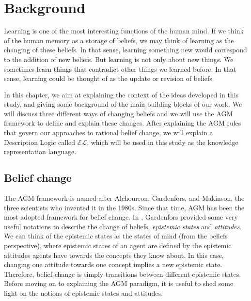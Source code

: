 \chapter{Background}
\label{background}
Learning is one of the most interesting functions of the human mind. If we think of the human memory as a storage of beliefs, we may think of learning as the changing of these beliefs. In that sense, learning something new would correspond to the addition of new beliefs. But learning is not only about new things. We sometimes learn things that contradict other things we learned before. In that sense, learning could be thought of as the update or revision of beliefs. 

In this chapter, we aim at explaining the context of the ideas developed in this study, and giving some background of the main building blocks of our work. We will discuss three different ways of changing beliefs and we will use the AGM framework\cite{kr} to define and explain these changes. After explaining the AGM rules that govern our approaches to rational belief change, we will explain a Description Logic called $\mathcal{EL}$, which will be used in this study as the knowledge representation language.

\section{Belief change}
The AGM framework \cite{kr} is named after Alchourron, Gardenfors, and Makinson, the three scientists who invented it in the 1980s. Since that time, AGM has been the most adopted framework for belief change. In \cite{flux}, Gardenfors provided some very useful notations to describe the change of beliefs, \textit{epistemic states} and \textit{attitudes}. We can think of the epistemic states as the states of mind (from the beliefs perspective), where epistemic states of an agent are defined by the epistemic attitudes agents have towards the concepts they know about. In this case, changing one attitude towards one concept implies a new epistemic state. Therefore, belief change is simply transitions between different epistemic states. Before moving on to explaining the AGM paradigm, it is useful to shed some light on the notions of epistemic states and attitudes.

